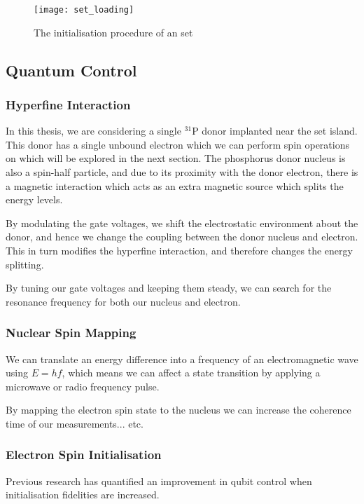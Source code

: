 	\begin{figure}[htbp!]
		\centering
		\texttt{[image: set\_loading]}
		\caption[The initiliasation prodedure]{The initialisation procedure of an \gls{set}\cite{morello2010single}}
		\label{fig::set_loading}
	\end{figure}
	
\subsection{Quantum Control}
	\subsubsection{Hyperfine Interaction}
		In this thesis, we are considering a single $^{31}$P donor implanted near the \gls{set} island. This donor has a single unbound electron which we can perform spin operations on which will be explored in the next section. The phosphorus donor nucleus is also a spin-half particle, and due to its proximity with the donor electron, there is a magnetic interaction which acts as an extra magnetic source which splits the energy levels.
		
		By modulating the gate voltages, we shift the electrostatic environment about the donor, and hence we change the coupling between the donor nucleus and electron. This in turn modifies the hyperfine interaction, and therefore changes the energy splitting.
		
		By tuning our gate voltages and keeping them steady, we can search for the resonance frequency for both our nucleus and electron. 
	\subsubsection{Nuclear Spin Mapping}
		We can translate an energy difference into a frequency of an electromagnetic wave using $E = h f$, which means we can affect a state transition by applying a microwave or radio frequency pulse.
		
		By mapping the electron spin state to the nucleus we can increase the coherence time of our measurements... etc.
		
	
	\subsubsection{Electron Spin Initialisation}
	Previous research \cite{rachpon_thesis} has quantified an improvement in qubit control when initialisation fidelities are increased.
	
